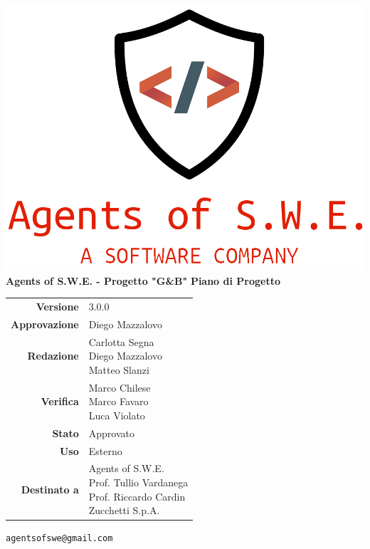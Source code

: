


\usepackage{graphicx}

\renewcommand{\listtablename}{Indice delle Tabelle}
\renewcommand{\listfigurename}{Indice di Figure e Grafici}



\begin{titlepage}
\thispagestyle{empty}

\begin{center}
\includegraphics[scale=0.3]{./images/logo.png}\\
\large \textbf{Agents of S.W.E. - Progetto "G\&B"}
\vfill
\Huge \textbf{Piano di Progetto}
\vfill
\large
\renewcommand{\arraystretch}{1.3}
\begin{tabular}{r|l}


\textbf{Versione} & 3.0.0\\
\textbf{Approvazione} & Diego Mazzalovo\\
\textbf{Redazione} & \parbox[t]{5cm}{Carlotta Segna\\Diego Mazzalovo\\Matteo Slanzi}\\
\textbf{Verifica} & \parbox[t]{5cm}{Marco Chilese \\ Marco Favaro\\Luca Violato}\\
\textbf{Stato} & Approvato\\
\textbf{Uso} & Esterno\\
\textbf{Destinato a} & \parbox[t]{5cm}{Agents of S.W.E. \\Prof. Tullio Vardanega\\Prof. Riccardo Cardin \\ Zucchetti S.p.A.}
\end{tabular}
\vfill
\small
\texttt{agentsofswe@gmail.com}
\end{center}
\end{titlepage}

